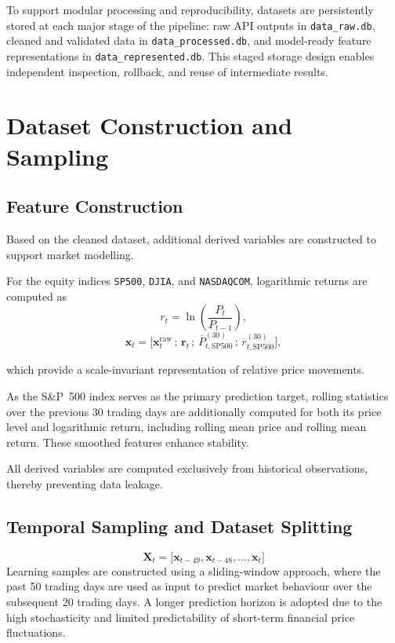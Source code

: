 \documentclass[10pt]{article} %
\begin{document}
To support modular processing and reproducibility, datasets are persistently stored at each major stage of the pipeline: raw API outputs in \texttt{data\_raw.db}, cleaned and validated data in \texttt{data\_processed.db}, and model-ready feature representations in \texttt{data\_represented.db}. This staged storage design enables independent inspection, rollback, and reuse of intermediate results.



\section{Dataset Construction and Sampling}

\subsection{Feature Construction}

Based on the cleaned dataset, additional derived variables are constructed to support market modelling.

For the equity indices \texttt{SP500}, \texttt{DJIA}, and \texttt{NASDAQCOM}, logarithmic returns are computed as
\begin{equation}
r_t = \ln\left(\frac{P_t}{P_{t-1}}\right),
\end{equation}
\begin{equation}
\mathbf{x}_t =
\Big[
\mathbf{x}^{\text{raw}}_t \,;\,
\mathbf{r}_t \,;\,
\overline{P}^{(30)}_{t,\text{SP500}} \,;\,
\overline{r}^{(30)}_{t,\text{SP500}}
\Big],
\end{equation}


which provide a scale-invariant representation of relative price movements.

As the S\&P~500 index serves as the primary prediction target, rolling statistics over the previous 30 trading days are additionally computed for both its price level and logarithmic return, including rolling mean price and rolling mean return. These smoothed features enhance stability.

All derived variables are computed exclusively from historical observations, thereby preventing data leakage.

\subsection{Temporal Sampling and Dataset Splitting}
\begin{equation}
\mathbf{X}_t = \big[\mathbf{x}_{t-49}, \mathbf{x}_{t-48}, \ldots, \mathbf{x}_{t}\big]
\end{equation}
Learning samples are constructed using a sliding-window approach, where the past 50 trading days are used as input to predict market behaviour over the subsequent 20 trading days. A longer prediction horizon is adopted due to the high stochasticity and limited predictability of short-term financial price fluctuations.
\end{document}
